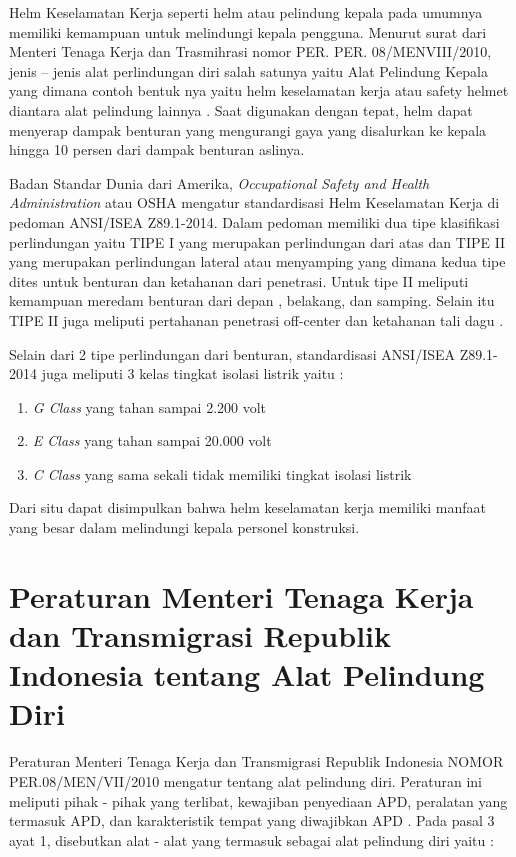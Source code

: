 Helm Keselamatan Kerja seperti helm atau pelindung kepala pada umumnya memiliki kemampuan untuk 
melindungi kepala pengguna. Menurut surat dari Menteri Tenaga Kerja dan Trasmihrasi nomor PER. PER. 08/MENVIII/2010, 
jenis – jenis alat perlindungan diri salah satunya yaitu Alat Pelindung Kepala yang dimana contoh bentuk
nya yaitu helm keselamatan kerja atau safety helmet diantara alat pelindung lainnya \cite{suratkementriantenagakerja}. 
Saat digunakan dengan tepat, helm dapat menyerap dampak benturan yang mengurangi gaya yang disalurkan ke kepala hingga 10 persen dari dampak benturan aslinya. \cite{kim2018safety}

Badan Standar Dunia dari Amerika, \emph{Occupational Safety and Health Administration} atau OSHA mengatur 
standardisasi Helm Keselamatan Kerja di pedoman ANSI/ISEA Z89.1-2014. Dalam pedoman memiliki dua tipe 
klasifikasi perlindungan yaitu TIPE I yang merupakan perlindungan dari atas dan TIPE II yang merupakan 
perlindungan lateral atau menyamping yang dimana kedua tipe dites untuk benturan dan ketahanan dari 
penetrasi. Untuk tipe II meliputi kemampuan meredam benturan dari depan , belakang, dan samping. 
Selain itu TIPE II juga meliputi pertahanan penetrasi off-center dan ketahanan tali dagu \cite{american1997american}.

Selain dari 2 tipe perlindungan dari benturan, standardisasi ANSI/ISEA Z89.1-2014 juga meliputi 3 kelas tingkat isolasi listrik yaitu \cite{american1997american}:
\begin{enumerate}
    \item \emph{G Class} yang tahan sampai 2.200 volt
    \item \emph{E Class} yang tahan sampai 20.000 volt
    \item \emph{C Class} yang sama sekali tidak memiliki tingkat isolasi listrik
\end{enumerate}

Dari situ dapat disimpulkan bahwa helm keselamatan kerja memiliki manfaat yang besar dalam melindungi kepala personel konstruksi.

\newpage

\section{Peraturan Menteri Tenaga Kerja dan Transmigrasi Republik Indonesia tentang Alat Pelindung Diri}
\label{sec:peraturanapd}

\par Peraturan Menteri Tenaga Kerja dan Transmigrasi Republik Indonesia NOMOR PER.08/MEN/VII/2010 mengatur tentang alat pelindung diri.
Peraturan ini meliputi pihak - pihak yang terlibat, kewajiban penyediaan APD, peralatan yang termasuk APD, dan karakteristik tempat
yang diwajibkan APD \cite{suratkementriantenagakerja}. Pada pasal 3 ayat 1, disebutkan alat - alat yang termasuk sebagai alat pelindung diri
yaitu :

